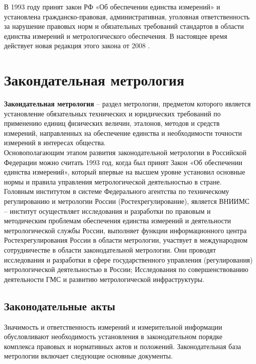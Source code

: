 \documentclass[14pt, a4paper] {ncc}
\begin{document}
В 1993 году принят закон РФ «Об обеспечении единства измерений» и установлена
гражданско-правовая, административная, уголовная ответственность за
нарушение правовых норм и обязательных требований стандартов в области
единства измерений и метрологического обеспечения. В настоящее время
действует новая редакция этого закона от 2008 \cite{hist}.

\newpage
\section{Закондательная метрология}
     {\bf Закондательная метрология} -- раздел метрологии, предметом которого
     является установление обязательных технических и юридических требований по
     применению единиц физических величин, эталонов, методов и средств измерений,
     направленных на обеспечение единства и необходимости точности измерений в
     интересах общества\cite{rmg29}. \\

    Основополагающим этапом развития законодательной метрологии в Российской
    Федерации можно считать 1993 год, когда был принят Закон «Об обеспечении единства
    измерений», который впервые на высшем уровне установил основные нормы и
    правила управления метрологической деятельностью в стране.\\

    Головным институтом в системе Федерального агентства
    по техническому регулированию и метрологии России (Ростехрегулирование), является ВНИИМС --
    институт осуществляет исследования и разработки по правовым и методическим
    проблемам обеспечения единства измерений и деятельности метрологической
    службы России, выполняет функции информационного центра Ростехрегулирования России
    в области метрологии, участвует в международном сотрудничестве в области
    законодательной метрологии. Они проводят исследования и разработки в сфере
	государственного управления (регулирования) метрологической деятельностью в России;
    Исследования по совершенствованию деятельности ГМС и развитию метрологической инфраструктуры.\cite{wiki}

    \subsection{Законодательные акты}

    Значимость и ответственность измерений и измерительной информации
    обусловливают необходимость установления в законодательном порядке
    комплекса правовых и нормативных актов и положений. Законодательная база
    метрологии включает следующие основные документы.
\end{document}
